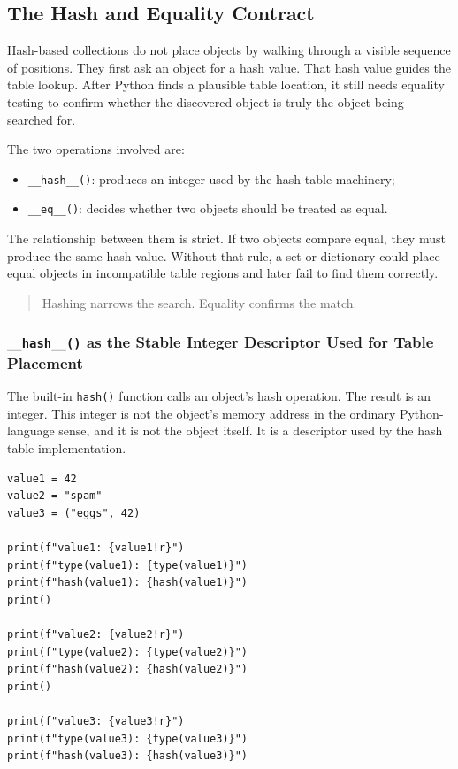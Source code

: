 \subsection{The Hash and Equality Contract}

Hash-based collections do not place objects by walking through a visible sequence of positions. They first ask an object for a hash value. That hash value guides the table lookup. After Python finds a plausible table location, it still needs equality testing to confirm whether the discovered object is truly the object being searched for.

The two operations involved are:

\begin{itemize}
    \item \texttt{\_\_hash\_\_()}: produces an integer used by the hash table machinery;
    \item \texttt{\_\_eq\_\_()}: decides whether two objects should be treated as equal.
\end{itemize}

The relationship between them is strict. If two objects compare equal, they must produce the same hash value. Without that rule, a set or dictionary could place equal objects in incompatible table regions and later fail to find them correctly.

\begin{quote}
Hashing narrows the search. Equality confirms the match.
\end{quote}

\subsubsection{\texttt{\_\_hash\_\_()} as the Stable Integer Descriptor Used for Table Placement}

The built-in \texttt{hash()} function calls an object's hash operation. The result is an integer. This integer is not the object's memory address in the ordinary Python-language sense, and it is not the object itself. It is a descriptor used by the hash table implementation.

\begin{verbatim}
value1 = 42
value2 = "spam"
value3 = ("eggs", 42)

print(f"value1: {value1!r}")
print(f"type(value1): {type(value1)}")
print(f"hash(value1): {hash(value1)}")
print()

print(f"value2: {value2!r}")
print(f"type(value2): {type(value2)}")
print(f"hash(value2): {hash(value2)}")
print()

print(f"value3: {value3!r}")
print(f"type(value3): {type(value3)}")
print(f"hash(value3): {hash(value3)}")
\end{verbatim}


